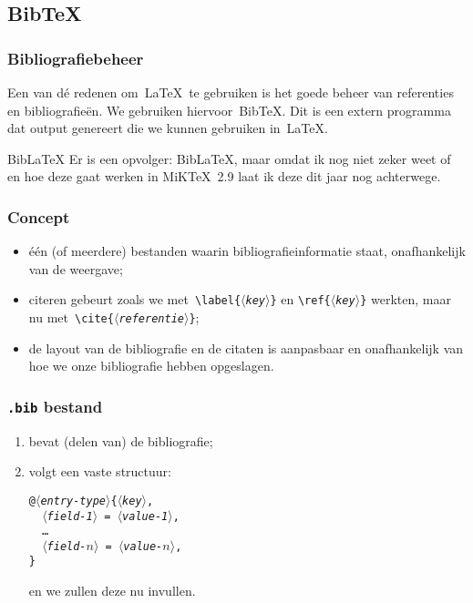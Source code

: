 \subsection{Bib\TeX}
\begin{frame}
  \frametitle{Bibliografiebeheer}

  Een van d\'e redenen om~\LaTeX\ te gebruiken is het goede beheer van referenties en bibliografie\"en. We gebruiken hiervoor~Bib\TeX. Dit is een extern programma dat output genereert die we kunnen gebruiken in~\LaTeX.

  \begin{exampleblock}{Bib\LaTeX}
    Er is een opvolger: Bib\LaTeX, maar omdat ik nog niet zeker weet of en hoe deze gaat werken in MiK\TeX~2.9 laat ik deze dit jaar nog achterwege.
  \end{exampleblock}
\end{frame}

\begin{frame}
  \frametitle{Concept}

  \begin{itemize}
    \item \'e\'en (of meerdere) bestanden waarin bibliografie\-informatie staat, onafhankelijk van de weergave;
    \item citeren gebeurt zoals we met~\texttt{\textcolor{uagreen}{\textbackslash label}\{$\langle$\textsl{key}$\rangle$\}} en \texttt{\textcolor{uagreen}{\textbackslash ref}\{$\langle$\textsl{key}$\rangle$\}} werkten, maar nu met~\texttt{\textcolor{uagreen}{\textbackslash cite}\{$\langle$\textsl{referentie}$\rangle$\}};
    \item de layout van de bibliografie en de citaten is aanpasbaar en onafhankelijk van hoe we onze bibliografie hebben opgeslagen.
  \end{itemize}
\end{frame}

\begin{frame}
  \frametitle{\texttt{.bib} bestand}

  \begin{enumerate}
    \item bevat (delen van) de bibliografie;
    \item volgt een vaste structuur:

      \texttt{@\textsl{$\langle$entry-type$\rangle$}\{\textsl{$\langle$key$\rangle$},\\
      \ \ \textsl{$\langle$field-1$\rangle$} = \textsl{$\langle$value-1$\rangle$}, \\
      \ \ \ldots \\
      \ \ \textsl{$\langle$field-$n\rangle$} = \textsl{$\langle$value-$n\rangle$}, \\
      \}}
      
      en we zullen deze nu invullen.
  \end{enumerate}
\end{frame}

